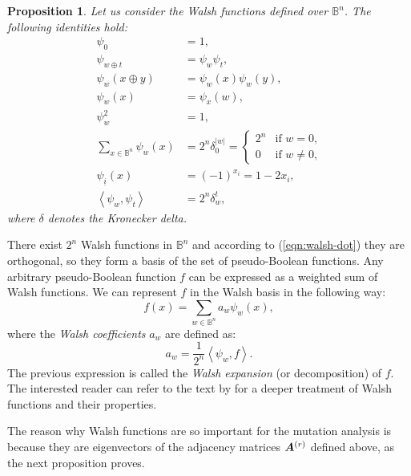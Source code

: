 \documentclass{article}
\newtheorem{proposition}{Proposition}
\def\vec#1{\mathchoice{\mbox{\boldmath$\displaystyle#1$}}
  {\mbox{\boldmath$\textstyle#1$}}
  {\mbox{\boldmath$\scriptstyle#1$}}
  {\mbox{\boldmath$\scriptscriptstyle#1$}}}
\newcommand{\Bo}[0]{\mathbb{B}}
\newcommand{\dotproduct}[2]{\left\langle #1,#2 \right\rangle}
\begin{document}
\begin{proposition}
Let us consider the Walsh functions defined over $\Bo^n$. The following identities hold:
\begin{align}
\label{eqn:walsh-zero}\psi_{0} &= 1, \\
\label{eqn:walsh-oplus} \psi_{w \oplus t} &= \psi_w  \psi_{t} ,\\
\label{eqn:sum-arg}\psi_{w}(x \oplus y) &= \psi_{w}(x) \psi_{w}(y), \\
\label{eqn:walsh-swap}\psi_{w}(x) &= \psi_{x}(w), \\
\label{eqn:walsh-square}\psi_{w}^2 &= 1, \\
\label{eqn:walsh-sum} \sum_{x \in \Bo^n} \psi_{w}(x) &= 2^n \delta_0^{|w|} 
= \left\{ \begin{array}{ll} 2^n & \mbox{if $w=0$,} \\ 0 & \mbox{if $w \neq 0$,}\end{array}\right.\\
\label{eqn:walsh-bit}\psi_{\underline{i}}(x) &= (-1)^{x_i} = 1 -2 x_i, \\
\label{eqn:walsh-dot}\dotproduct{\psi_{w}}{\psi_{t}} &= 2^n \delta_{w}^t,
\end{align}
where $\delta$ denotes the Kronecker delta.
\end{proposition}


There exist $2^n$ Walsh functions in $\Bo^n$ and according to (\ref{eqn:walsh-dot}) they are orthogonal, so they form a basis of the set of pseudo-Boolean functions. Any arbitrary pseudo-Boolean function $f$ can be expressed as a weighted sum of Walsh functions. We can represent $f$ in the Walsh basis in the following way:
\begin{equation}
f(x) = \sum_{w \in \Bo^n} a_w \psi_{w}(x),
\end{equation}
where the \emph{Walsh coefficients} $a_w$ are defined as:
\begin{equation}
\label{eqn:walsh-coeff}
a_w = \frac{1}{2^n} \dotproduct{\psi_w}{f}.
\end{equation}
The previous expression is called the \emph{Walsh expansion} (or decomposition) of $f$. The interested reader can refer to the text by \citet{Terras1999} for a deeper treatment of Walsh functions and their properties.

The reason why Walsh functions are so important for the mutation analysis is because they are eigenvectors of the adjacency matrices $\vec{A}^{(r)}$ defined above, as the next proposition proves.
\end{document}

